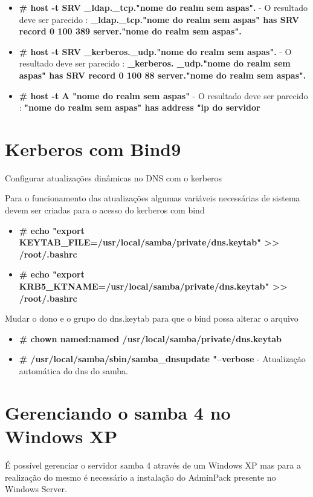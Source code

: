 \begin{itemize}
	\item \textbf{\# host -t SRV \_ldap.\_tcp."nome do realm sem aspas".} - O resultado deve ser parecido : \textbf{\_ldap.\_tcp."nome do realm sem aspas" has SRV record 0 100 389 server."nome do realm sem aspas".}
	\item \textbf{\# host -t SRV \_kerberos.\_udp."nome do realm sem aspas".} - O resultado deve ser parecido : \textbf{\_kerberos. \_udp."nome do realm sem aspas" has SRV record 0 100 88 server."nome do realm sem aspas".}
	\item \textbf{\# host -t A "nome do realm sem aspas"} - O resultado deve ser parecido : \textbf{"nome do realm sem aspas" has address "ip do servidor}
\end{itemize}

\section{Kerberos com Bind9}

Configurar atualizações dinâmicas no DNS com o kerberos

Para o funcionamento das atualizações algumas variáveis necessárias de sistema devem ser criadas para o acesso do kerberos com bind

\begin{itemize}
	\item \textbf{\# echo "export KEYTAB\_FILE=/usr/local/samba/private/dns.keytab" >> /root/.bashrc}
	\item \textbf{\# echo "export KRB5\_KTNAME=/usr/local/samba/private/dns.keytab" >> /root/.bashrc}
\end{itemize}

Mudar o dono e o grupo do dns.keytab para que o bind possa alterar o arquivo

\begin{itemize}
	\item \textbf{\# chown named:named /usr/local/samba/private/dns.keytab}
	\item \textbf{\# /usr/local/samba/sbin/samba\_dnsupdate "--verbose} - Atualização automática do dns do samba.
\end{itemize}

\section{Gerenciando o samba 4 no Windows XP}

É possível gerenciar o servidor samba 4 através de um Windows XP mas para a realização do mesmo é necessário a instalação do AdminPack presente no Windows Server.


